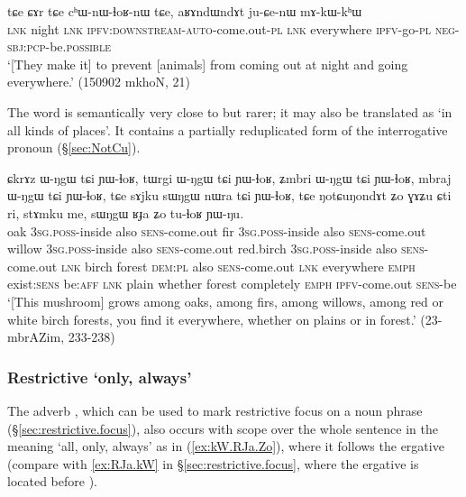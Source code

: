 \begin{exe}
\ex \label{ex:aRAndWndAt.juCenW}
\gll tɕe ɕɤr tɕe cʰɯ-nɯ-ɬoʁ-nɯ tɕe, aʁɤndɯndɤt ju-ɕe-nɯ mɤ-kɯ-kʰɯ \\
\textsc{lnk} night \textsc{lnk} \textsc{ipfv}:\textsc{downstream}-\textsc{auto}-come.out-\textsc{pl} \textsc{lnk} everywhere \textsc{ipfv}-go-\textsc{pl} \textsc{neg}-\textsc{sbj}:\textsc{pcp}-be.\textsc{possible} \\
\glt `[They make it] to prevent [animals] from coming out at night and going everywhere.' (150902 mkhoN, 21)
\end{exe} 

The word   is semantically very close to  but rarer; it may also be translated as `in all kinds of places'. It contains a partially reduplicated form of the interrogative pronoun  (§\ref{sec:NotCu}).

 \begin{exe}
\ex \label{ex:NotCuNondAt}
\gll ɕkrɤz ɯ-ŋgɯ tɕi ɲɯ-ɬoʁ, tɯrgi ɯ-ŋgɯ tɕi ɲɯ-ɬoʁ, ʑmbri ɯ-ŋgɯ tɕi ɲɯ-ɬoʁ,  mbraj ɯ-ŋgɯ tɕi ɲɯ-ɬoʁ, tɕe sɤjku sɯŋgɯ nɯra tɕi ɲɯ-ɬoʁ, tɕe ŋotɕuŋondɤt ʑo ɣɤʑu ɕti ri, stɤmku me, sɯŋgɯ ʁɟa ʑo tu-ɬoʁ ɲɯ-ŋu. \\
oak \textsc{3sg}.\textsc{poss}-inside also \textsc{sens}-come.out fir \textsc{3sg}.\textsc{poss}-inside also \textsc{sens}-come.out willow \textsc{3sg}.\textsc{poss}-inside also \textsc{sens}-come.out red.birch \textsc{3sg}.\textsc{poss}-inside also \textsc{sens}-come.out \textsc{lnk} birch  forest \textsc{dem}:\textsc{pl} also \textsc{sens}-come.out \textsc{lnk} everywhere \textsc{emph} exist:\textsc{sens} be:\textsc{aff}  \textsc{lnk} plain whether  forest completely \textsc{emph} \textsc{ipfv}-come.out \textsc{sens}-be \\
\glt `[This mushroom] grows among oaks, among firs, among willows, among red or white birch forests, you find it everywhere, whether on plains or in forest.' (23-mbrAZim, 233-238)
\end{exe} 


\subsubsection{Restrictive `only, always'} \label{sec:restrictive.adverbs}
 The adverb  , which can be used to mark restrictive focus on a noun phrase (§\ref{sec:restrictive.focus}), also occurs with scope over the whole sentence in the meaning `all, only, always' as in (\ref{ex:kW.RJa.Zo}), where it follows the ergative  (compare with \ref{ex:RJa.kW} in §\ref{sec:restrictive.focus}, where the ergative is located before ).

